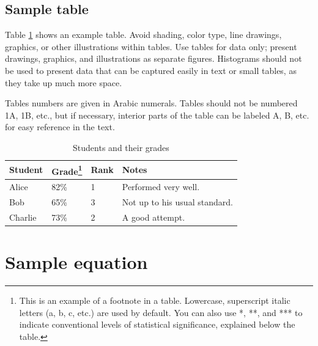 \documentclass[9pt, onecolumn,twoside]{gsajnl}
\begin{document}

\subsection{Sample table}

Table \ref{tab:shape-functions} shows an example table. Avoid shading, color type, line drawings, graphics, or other illustrations within tables. Use tables for data only; present drawings, graphics, and illustrations as separate figures. Histograms should not be used to present data that can be captured easily in text or small tables, as they take up much more space.

Tables numbers are given in Arabic numerals. Tables should not be numbered 1A, 1B, etc., but if necessary, interior parts of the table can be labeled A, B, etc. for easy reference in the text.

\begin{table}[p]
\centering
\caption{Students and their grades}
\begin{tableminipage}{\textwidth}
\begin{tabularx}{\textwidth}{@{}XXXX@{}}
\hline
{\bf Student} & {\bf Grade}\footnote{This is an example of a footnote in a table. Lowercase, superscript italic letters (a, b, c, etc.) are used by default. You can also use *, **, and *** to indicate conventional levels of statistical significance, explained below the table.} & {\bf Rank} & {\bf Notes} \\
\hline
Alice & 82\% & 1 & Performed very well.\\
Bob & 65\% & 3 & Not up to his usual standard.\\
Charlie & 73\% & 2 & A good attempt.\\
\hline
\end{tabularx}
  \label{tab:shape-functions}
\end{tableminipage}
\end{table}

\section{Sample equation}
\end{document}
